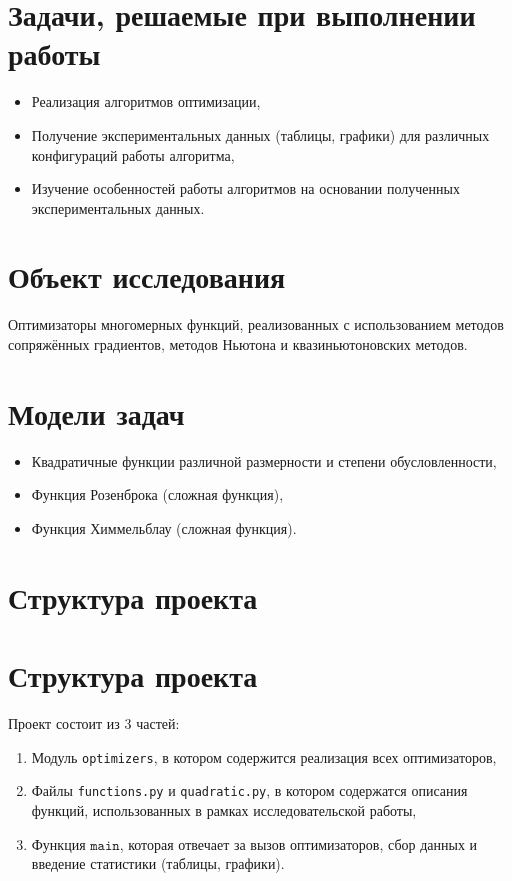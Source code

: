 \documentclass[12pt]{article}
\def\t{\texttt}
\begin{document}
\section{Задачи, решаемые при выполнении работы}
\begin{itemize}
    \item Реализация алгоритмов оптимизации,
    \item Получение экспериментальных данных (таблицы, графики) для различных конфигураций работы алгоритма,
    \item Изучение особенностей работы алгоритмов на основании полученных экспериментальных данных.
\end{itemize}

\section{Объект исследования}
Оптимизаторы многомерных функций, реализованных с использованием методов сопряжённых градиентов, методов Ньютона и квазиньютоновских методов.

\section{Модели задач}
\begin{itemize}
    \item Квадратичные функции различной размерности и степени обусловленности,
    \item Функция Розенброка (сложная функция),
    \item Функция Химмельблау (сложная функция).
\end{itemize}

\section{Структура проекта}

\section{Структура проекта}
Проект состоит из 3 частей:
\begin{enumerate}
    \item Модуль \t{optimizers}, в котором содержится реализация всех оптимизаторов,
    \item Файлы \t{functions.py} и \t{quadratic.py}, в котором содержатся описания функций, использованных в рамках исследовательской работы,
    \item Функция $\t{main}$, которая отвечает за вызов оптимизаторов, сбор данных и введение статистики (таблицы, графики).
\end{enumerate}
\end{document}
